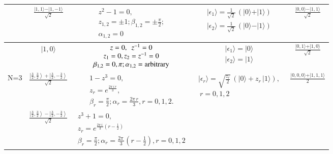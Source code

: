 {\begin{table}
{\begin{tabular}{|c c|c|c|c|}
\hline 
  & $\frac{\vert 1,1\rangle - \vert 1,-1\rangle}{\sqrt{2}}$
& $\begin{array}{c} z^2-1=0,\\ z_{1,2}=\pm 1; \beta_{1,2}=\pm \frac{\pi}{2}; \\ 
\alpha_{1,2}=0 \end{array}$ & $\begin{array}{c}\vert \epsilon_{1}\rangle=
  \frac{1}{\sqrt{2}}\, \left(\vert 0\rangle+ \vert 1\rangle\right)  \\ 
   \vert \epsilon_{2}\rangle=
  \frac{1}{\sqrt{2}}\, \left(\vert0\rangle- \vert 1\rangle\right)
  \end{array}$  & $\frac{\vert 0,0\rangle - \vert 1,1\rangle}{\sqrt{2}}$\\        
\hline 
 & $\vert 1,0\rangle $
& $\begin{array}{c} z=0,\ \ z^{-1}=0  \\
z_{1}=0, z_2=z^{-1}=0 \\  \beta_{1,2}=0, \pi; \alpha_{1,2}={\rm arbitrary}\end{array}$
 & $\begin{array}{c}\vert \epsilon_{1}\rangle=\vert0\rangle \\ 
\vert \epsilon_{2}\rangle=
  \vert1\rangle \end{array}$ & $\frac{\vert 0,1\rangle + \vert 1,0\rangle}{\sqrt{2}}$\\        
\hline 
N=3  &  $\frac{\left\vert \frac{3}{2},\frac{3}{2}\right\rangle
+\left\vert \frac{3}{2},-\frac{3}{2}\right\rangle}{\sqrt{2}}$
& $\begin{array}{c} 1- z^3=0, \\
z_{r}=e^{\frac{2\pi\, i\, r}{3}},   \\ 
\beta_{r}=\frac{\pi}{2}; \alpha_{r}=\frac{2\pi\, r}{3}, r=0,1,2.\end{array}$
& $\begin{array}{c}\vert \epsilon_{r}\rangle=
  \sqrt{\frac{z_r}{2}}\, \left(\vert 0\rangle+ z_r\, \vert 1\rangle\right),  \\ \ r=0,1,2\end{array}$
& $\frac{\vert 0,0,0\rangle+\vert 1,1,1\rangle}{2}$ \\
\hline 
  &  $\frac{\left\vert \frac{3}{2},\frac{3}{2}\right\rangle
-\left\vert \frac{3}{2},-\frac{3}{2}\right\rangle}{\sqrt{2}}$
& $\begin{array}{c}z^3+1=0, \\ 
z_{r}=e^{\frac{2\pi\, i\,}{3}(r-\frac{1}{2})} \\
\beta_{r}=\frac{\pi}{2}; \alpha_{r}=\frac{2\pi\, }{3}(r-\frac{1}{2}), r=0,1,2 \end{array}$

\end{tabular}}
\end{table}}
